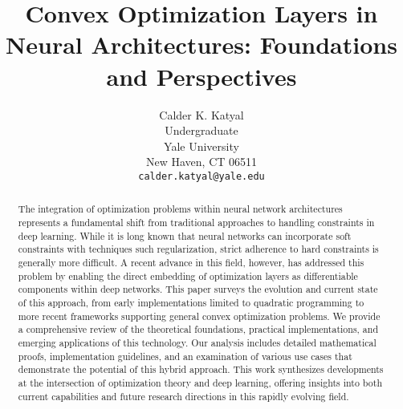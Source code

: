 \documentclass{article}
\title{Convex Optimization Layers in Neural Architectures: Foundations and Perspectives}
\author{%
  Calder K. Katyal\\
  Undergraduate\\
  Yale University\\
  New Haven, CT 06511 \\
  \texttt{calder.katyal@yale.edu} \\
}
\begin{document}
\maketitle

\begin{abstract}
    The integration of optimization problems within neural network architectures represents a fundamental shift from traditional approaches to handling constraints in deep learning. While it is long known that neural networks can incorporate soft constraints with techniques such regularization, strict adherence to hard constraints is generally more difficult. A recent advance in this field, however, has addressed this problem by enabling the direct embedding of optimization layers as differentiable components within deep networks. This paper surveys the evolution and current state of this approach, from early implementations limited to quadratic programming to more recent frameworks supporting general convex optimization problems. We provide a comprehensive review of the theoretical foundations, practical implementations, and emerging applications of this technology. Our analysis includes detailed mathematical proofs, implementation guidelines, and an examination of various use cases that demonstrate the potential of this hybrid approach. This work synthesizes developments at the intersection of optimization theory and deep learning, offering insights into both current capabilities and future research directions in this rapidly evolving field. 
\end{abstract}
\end{document}
